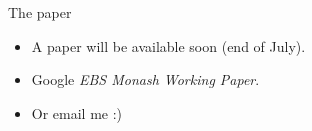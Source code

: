 \documentclass{beamer}
\begin{document}
    \begin{frame}{The paper}
    	\begin{itemize}
    		\item A paper will be available soon (end of July).
    		\item Google {\em EBS Monash Working Paper}.
    		\item Or email me :)
    	\end{itemize}
    \end{frame}
\end{document}
